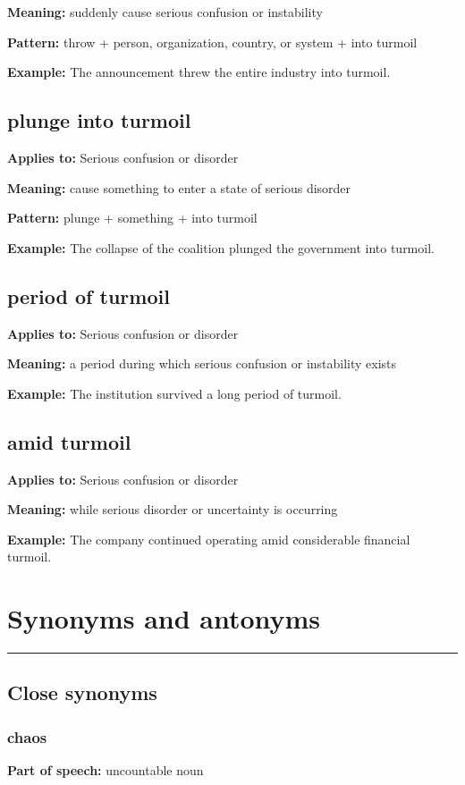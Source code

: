 \documentclass[11pt]{article}
\newcommand{\sectionrule}{\par\vspace{-0.5em}\noindent\textcolor{Accent}{\rule{\linewidth}{0.6pt}}\par}
\begin{document}
\textbf{Meaning:} suddenly cause serious confusion or instability

\textbf{Pattern:} throw + person, organization, country, or system + into turmoil

\textbf{Example:} The announcement threw the entire industry into turmoil.

\subsection{plunge into turmoil}
\textbf{Applies to:} Serious confusion or disorder

\textbf{Meaning:} cause something to enter a state of serious disorder

\textbf{Pattern:} plunge + something + into turmoil

\textbf{Example:} The collapse of the coalition plunged the government into turmoil.

\subsection{period of turmoil}
\textbf{Applies to:} Serious confusion or disorder

\textbf{Meaning:} a period during which serious confusion or instability exists

\textbf{Example:} The institution survived a long period of turmoil.

\subsection{amid turmoil}
\textbf{Applies to:} Serious confusion or disorder

\textbf{Meaning:} while serious disorder or uncertainty is occurring

\textbf{Example:} The company continued operating amid considerable financial turmoil.

\section{Synonyms and antonyms}
\sectionrule
\subsection{Close synonyms}
\subsubsection{chaos}
\textbf{Part of speech:} uncountable noun
\end{document}
